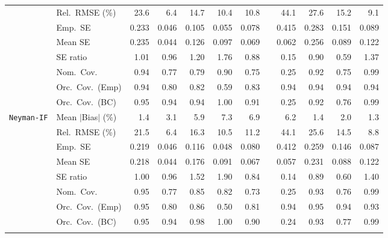 \begin{landscape}
\begin{longtable}{llrrrrrrrrrr}
 & Rel.\ RMSE (\%) & 23.6 & \cellcolor{rankone}6.4 & 14.7 & \cellcolor{rankthree}10.4 & 10.8 &  & 44.1 & 27.6 & 15.2 & \cellcolor{ranktwo}9.1 \\
 & Emp.\ SE & 0.233 & 0.046 & 0.105 & 0.055 & 0.078 &  & 0.415 & 0.283 & 0.151 & 0.089 \\
 & Mean SE & 0.235 & 0.044 & 0.126 & 0.097 & 0.069 &  & 0.062 & 0.256 & 0.089 & 0.122 \\
 & SE ratio & \cellcolor{rankone}1.01 & \cellcolor{ranktwo}0.96 & 1.20 & 1.76 & 0.88 &  & 0.15 & \cellcolor{rankthree}0.90 & 0.59 & 1.37 \\
 & Nom.\ Cov. & \cellcolor{rankone}0.94 & 0.77 & 0.79 & 0.90 & 0.75 &  & 0.25 & \cellcolor{ranktwo}0.92 & 0.75 & \cellcolor{rankthree}0.99 \\
 & Orc.\ Cov.\ (Emp) & 0.94 & 0.80 & 0.82 & 0.59 & 0.83 &  & \cellcolor{ranktwo}0.94 & \cellcolor{rankone}0.94 & \cellcolor{rankthree}0.94 & 0.94 \\
 & Orc.\ Cov.\ (BC) & \cellcolor{rankone}0.95 & \cellcolor{ranktwo}0.94 & \cellcolor{rankthree}0.94 & 1.00 & 0.91 &  & 0.25 & 0.92 & 0.76 & 0.99 \\
\addlinespace[2pt]
\quad \texttt{Neyman-IF} & Mean $|$Bias$|$ (\%) & \cellcolor{rankthree}1.4 & 3.1 & 5.9 & 7.3 & 6.9 &  & 6.2 & \cellcolor{ranktwo}1.4 & 2.0 & \cellcolor{rankone}1.3 \\
 & Rel.\ RMSE (\%) & 21.5 & \cellcolor{rankone}6.4 & 16.3 & \cellcolor{rankthree}10.5 & 11.2 &  & 44.1 & 25.6 & 14.5 & \cellcolor{ranktwo}8.8 \\
 & Emp.\ SE & 0.219 & 0.046 & 0.116 & 0.048 & 0.080 &  & 0.412 & 0.259 & 0.146 & 0.087 \\
 & Mean SE & 0.218 & 0.044 & 0.176 & 0.091 & 0.067 &  & 0.057 & 0.231 & 0.088 & 0.122 \\
 & SE ratio & \cellcolor{rankone}1.00 & \cellcolor{ranktwo}0.96 & 1.52 & 1.90 & 0.84 &  & 0.14 & \cellcolor{rankthree}0.89 & 0.60 & 1.40 \\
 & Nom.\ Cov. & \cellcolor{rankone}0.95 & 0.77 & 0.85 & 0.82 & 0.73 &  & 0.25 & \cellcolor{ranktwo}0.93 & 0.76 & \cellcolor{rankthree}0.99 \\
 & Orc.\ Cov.\ (Emp) & \cellcolor{rankone}0.95 & 0.80 & 0.86 & 0.50 & 0.81 &  & \cellcolor{rankthree}0.94 & \cellcolor{ranktwo}0.95 & 0.94 & 0.93 \\
 & Orc.\ Cov.\ (BC) & \cellcolor{rankone}0.95 & \cellcolor{ranktwo}0.94 & 0.98 & 1.00 & 0.90 &  & 0.24 & \cellcolor{rankthree}0.93 & 0.77 & 0.99 \\
\addlinespace[2pt]

\end{longtable}
\end{landscape}
